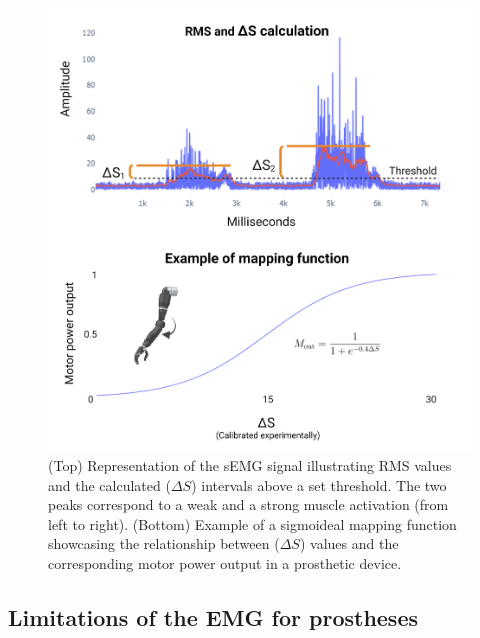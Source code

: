 \documentclass[conference]{IEEEtran}
\begin{document}
\begin{figure}[h]
   \centering
   \includegraphics[width=1\linewidth]{prothesis movement.png}
   \caption{(Top) Representation of the sEMG signal illustrating RMS values and the calculated (\( \Delta S \)) intervals above a set threshold. The two peaks correspond to a weak and a strong
   muscle activation (from left to right). (Bottom) Example of a sigmoideal mapping function showcasing the relationship between (\( \Delta S \)) values and the corresponding motor power output in a prosthetic device.}
   \label{fig:prothesis}
\end{figure}

\subsection{Limitations of the EMG for prostheses}
\end{document}
